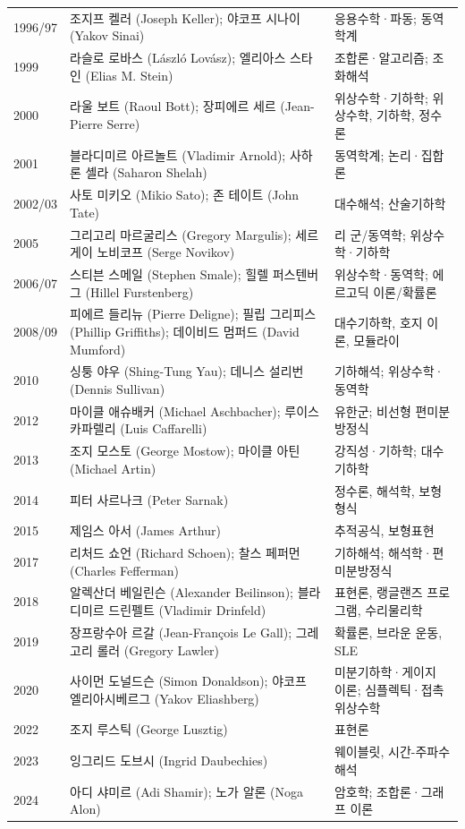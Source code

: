 \begin{center}
\begin{longtable}{@{}L{0.09\textwidth}L{0.39\textwidth}L{0.44\textwidth}@{}}
1996/97 & 조지프 켈러 (Joseph Keller); 야코프 시나이 (Yakov Sinai) & 응용수학·파동; 동역학계\\
1999 & 라슬로 로바스 (László Lovász); 엘리아스 스타인 (Elias M. Stein) & 조합론·알고리즘; 조화해석\\
2000 & 라울 보트 (Raoul Bott); 장피에르 세르 (Jean-Pierre Serre) & 위상수학·기하학; 위상수학, 기하학, 정수론\\
2001 & 블라디미르 아르놀트 (Vladimir Arnold); 사하론 셸라 (Saharon Shelah) & 동역학계; 논리·집합론\\
2002/03 & 사토 미키오 (Mikio Sato); 존 테이트 (John Tate) & 대수해석; 산술기하학\\
2005 & 그리고리 마르굴리스 (Gregory Margulis); 세르게이 노비코프 (Serge Novikov) & 리 군/동역학; 위상수학·기하학\\
2006/07 & 스티븐 스메일 (Stephen Smale); 힐렐 퍼스텐버그 (Hillel Furstenberg) & 위상수학·동역학; 에르고딕 이론/확률론\\
2008/09 & 피에르 들리뉴 (Pierre Deligne); 필립 그리피스 (Phillip Griffiths); 데이비드 멈퍼드 (David Mumford) & 대수기하학, 호지 이론, 모듈라이\\
2010 & 싱퉁 야우 (Shing-Tung Yau); 데니스 설리번 (Dennis Sullivan) & 기하해석; 위상수학·동역학\\
2012 & 마이클 애슈배커 (Michael Aschbacher); 루이스 카파렐리 (Luis Caffarelli) & 유한군; 비선형 편미분방정식\\
2013 & 조지 모스토 (George Mostow); 마이클 아틴 (Michael Artin) & 강직성·기하학; 대수기하학\\
2014 & 피터 사르나크 (Peter Sarnak) & 정수론, 해석학, 보형형식\\
2015 & 제임스 아서 (James Arthur) & 추적공식, 보형표현\\
2017 & 리처드 쇼언 (Richard Schoen); 찰스 페퍼먼 (Charles Fefferman) & 기하해석; 해석학·편미분방정식\\
2018 & 알렉산더 베일린슨 (Alexander Beilinson); 블라디미르 드린펠트 (Vladimir Drinfeld) & 표현론, 랭글랜즈 프로그램, 수리물리학\\
2019 & 장프랑수아 르갈 (Jean-François Le Gall); 그레고리 롤러 (Gregory Lawler) & 확률론, 브라운 운동, SLE\\
2020 & 사이먼 도널드슨 (Simon Donaldson); 야코프 엘리아시베르그 (Yakov Eliashberg) & 미분기하학·게이지 이론; 심플렉틱·접촉 위상수학\\
2022 & 조지 루스틱 (George Lusztig) & 표현론\\
2023 & 잉그리드 도브시 (Ingrid Daubechies) & 웨이블릿, 시간-주파수 해석\\
2024 & 아디 샤미르 (Adi Shamir); 노가 알론 (Noga Alon) & 암호학; 조합론·그래프 이론\\
\end{longtable}
\end{center}

